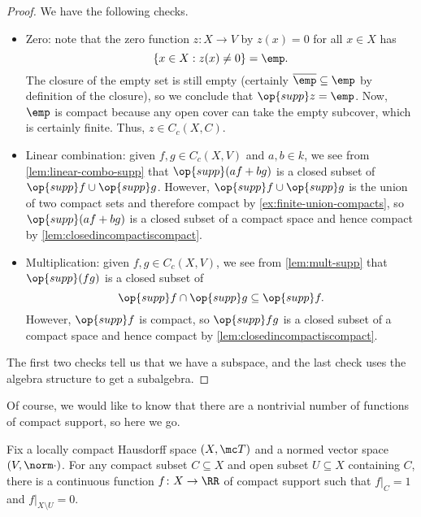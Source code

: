 \documentclass[../notes.tex]{subfiles}
\begin{document}
\begin{proof}
	We have the following checks.
	\begin{itemize}
		\item Zero: note that the zero function $z\colon X\to V$ by $z(x)=0$ for all $x\in X$ has
		\[\{x\in X:z(x)\ne0\}=\emp.\]
		The closure of the empty set is still empty (certainly $\overline\emp\subseteq\emp$ by definition of the closure), so we conclude that $\op{supp}z=\emp$. Now, $\emp$ is compact because any open cover can take the empty subcover, which is certainly finite. Thus, $z\in C_c(X,C)$.
		\item Linear combination: given $f,g\in C_c(X,V)$ and $a,b\in k$, we see from \autoref{lem:linear-combo-supp} that $\op{supp}(af+bg)$ is a closed subset of $\op{supp}f\cup\op{supp}g$. However, $\op{supp}f\cup\op{supp}g$ is the union of two compact sets and therefore compact by \autoref{ex:finite-union-compacts}, so $\op{supp}(af+bg)$ is a closed subset of a compact space and hence compact by \autoref{lem:closedincompactiscompact}.
		\item Multiplication: given $f,g\in C_c(X,V)$, we see from \autoref{lem:mult-supp} that $\op{supp}(fg)$ is a closed subset of
		\[\op{supp}f\cap\op{supp}g\subseteq\op{supp}f.\]
		However, $\op{supp}f$ is compact, so $\op{supp}fg$ is a closed subset of a compact space and hence compact by \autoref{lem:closedincompactiscompact}.
	\end{itemize}
	The first two checks tell us that we have a subspace, and the last check uses the algebra structure to get a subalgebra.
\end{proof}
Of course, we would like to know that there are a nontrivial number of functions of compact support, so here we go.
\begin{proposition}
	Fix a locally compact Hausdorff space $(X,\mc T)$ and a normed vector space $(V,\norm\cdot)$. For any compact subset $C\subseteq X$ and open subset $U\subseteq X$ containing $C$, there is a continuous function $f\colon X\to\RR$ of compact support such that $f|_C=1$ and $f|_{X\setminus U}=0$.
\end{proposition}
\end{document}

